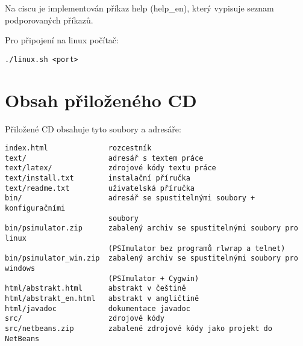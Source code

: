 \documentclass[11pt,twoside,a4paper]{book}
\begin{document}
Na ciscu je implementován příkaz help (help\_en), který vypisuje seznam podporovaných příkazů.

Pro připojení na linux počítač:
\begin{verbatim}
./linux.sh <port>
\end{verbatim} 




\chapter{Obsah přiloženého CD}

Přiložené CD obsahuje tyto soubory a adresáře:

\begin{verbatim}
index.html              rozcestník
text/                   adresář s textem práce
text/latex/             zdrojové kódy textu práce
text/install.txt        instalační příručka
text/readme.txt         uživatelská příručka
bin/                    adresář se spustitelnými soubory + konfiguračními 
                        soubory
bin/psimulator.zip      zabalený archiv se spustitelnými soubory pro linux
                        (PSImulator bez programů rlwrap a telnet)
bin/psimulator_win.zip  zabalený archiv se spustitelnými soubory pro windows
                        (PSImulator + Cygwin)
html/abstrakt.html      abstrakt v češtině
html/abstrakt_en.html   abstrakt v angličtině
html/javadoc            dokumentace javadoc
src/                    zdrojové kódy
src/netbeans.zip        zabalené zdrojové kódy jako projekt do NetBeans
\end{verbatim} 


% 
% 
% 
% 
\end{document}
